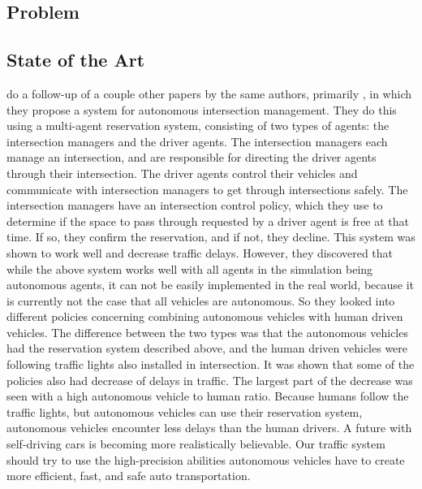 
\subsection{Problem}
\label{sub:intro:problem}

\subsection{State of the Art}
\label{sub:intro:state_of_the_art}



\textcite{dresner2007sharing} do a follow-up of a couple other papers by the same authors, primarily \textcite{dresner2005traffic}, in which they propose a system for autonomous intersection management. They do this using a multi-agent reservation system, consisting of two types of agents: the intersection managers and the driver agents. The intersection managers each manage an intersection, and are responsible for directing the driver agents through their intersection. The driver agents control their vehicles and communicate with intersection managers to get through intersections safely. The intersection managers have an intersection control policy, which they use to determine if the space to pass through requested by a driver agent is free at that time. If so, they confirm the reservation, and if not, they decline. This system was shown to work well and decrease traffic delays. 
However, they discovered that while the above system works well with all agents in the simulation being autonomous agents, it can not be easily implemented in the real world, because it is currently not the case that all vehicles are autonomous. So they looked into different policies concerning combining autonomous vehicles with human driven vehicles. The difference between the two types was that the autonomous vehicles had the reservation system described above, and the human driven vehicles were following traffic lights also installed in intersection. 
It was shown that some of the policies also had decrease of delays in traffic. The largest part of the decrease was seen with a high autonomous vehicle to human ratio. Because humans follow the traffic lights, but autonomous vehicles can use their reservation system, autonomous vehicles encounter less delays than the human drivers. 
A future with self-driving cars is becoming more realistically believable. Our traffic system should try to use the high-precision abilities autonomous vehicles have to create more efficient, fast, and safe auto transportation.


